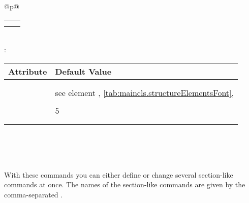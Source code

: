 \begin{longtable}{@{}p{\columnwidth}@{}}
\begin{tabularx}{\linewidth}{ll}
    \PValue{tocindent}   & \PValue{10em}\\
    \PValue{tocnumwidth} & \PValue{5em}\\
    \bottomrule
    \end{tabularx} \\
    \addlinespace[\normalbaselineskip]
    :  \\*
    \begin{tabularx}{\linewidth}{ll}
    \toprule
    Attribute & Default Value \\
    \midrule\nopagebreak
    \PValue{afterskip}   & \PValue{-1em} \\
    \PValue{beforeskip}  & \PValue{3.25ex plus 1ex minus .2ex} \\
    \PValue{font}        & see element \FontElement{subparagraph},
                           \autoref{tab:maincls.structureElementsFont}, 
                           \autopageref{tab:maincls.structureElementsFont} \\
    \PValue{indent}      & \Macro{scr@parindent} \\
    \PValue{level}       & 5 \\
    \PValue{tocindent}   & \PValue{12em}\\
    \PValue{tocnumwidth} & \PValue{6em}\\
    \bottomrule
    \end{tabularx}
  \end{longtable}
%
%
%
%
%


\begin{Declaration}
  \\
  \\
  \\
\end{Declaration}
%
%
%
%
With these commands you can either define or change several
section-like commands at once. The names of the section-like commands are
given by the comma-separated .

